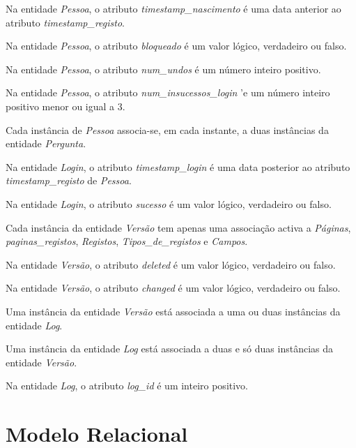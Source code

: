 \documentclass[11pt,a4paper]{article}
\begin{document}
\begin{description}[itemsep=3em]
  \item[RI1] Na entidade \textit{Pessoa}, o atributo \textit{timestamp\_nascimento} \'{e} uma data anterior ao atributo \textit{timestamp\_registo}.
  \item[RI2] Na entidade \textit{Pessoa}, o atributo \textit{bloqueado} \'{e} um valor l\'{o}gico, verdadeiro ou falso.


  \item[RI3] Na entidade \textit{Pessoa}, o atributo \textit{num\_undos} \'{e} um n\'{u}mero inteiro positivo.


  \item[RI4] Na entidade \textit{Pessoa}, o atributo \textit{num\_insucessos\_login} '{e} um n\'{u}mero inteiro positivo menor ou igual a 3.
  \item[RI5] Cada instância de \textit{Pessoa} associa-se, em cada instante, a duas instâncias da entidade \textit{Pergunta}.
  \item[RI6] Na entidade \textit{Login}, o atributo \textit{timestamp\_login} \'{e} uma data posterior ao atributo \textit{timestamp\_registo} de \textit{Pessoa}.
  \item[RI7] Na entidade \textit{Login}, o atributo \textit{sucesso} \'{e} um valor l\'{o}gico, verdadeiro ou falso.
  \item[RI8] Cada instância da entidade \textit{Versão} tem apenas uma associação activa a \textit{P\'{a}ginas}, \textit{paginas\_registos}, \textit{Registos}, \textit{Tipos\_de\_registos} e \textit{Campos}.
  \item[RI9] Na entidade \textit{Versão}, o atributo \textit{deleted} \'{e} um valor l\'{o}gico, verdadeiro ou falso.
  \item[RI10] Na entidade \textit{Versão}, o atributo \textit{changed} \'{e} um valor l\'{o}gico, verdadeiro ou falso.
  \item[RI11] Uma instância da entidade \textit{Versão} est\'{a} associada a uma ou duas instâncias da entidade \textit{Log}.
  \item[RI12] Uma instância da entidade \textit{Log} está associada a duas e s\'{o} duas instâncias da entidade \textit{Versão}.
  \item[RI13] Na entidade \textit{Log}, o atributo \textit{log\_id} \'{e} um inteiro positivo.
\end{description}

\newpage
\section{Modelo Relacional}
\end{document}
